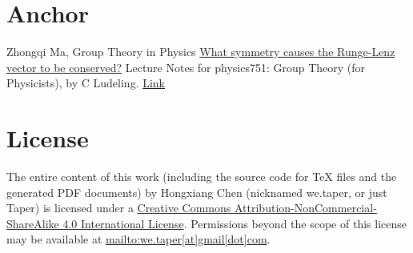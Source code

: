 \documentclass{article}
\numberwithin{equation}{subsection} %
\theoremstyle{definition}
\begin{document}
\section{Anchor}
\label{sec:Anchor}
\begin{thebibliography}{1}
     Zhongqi Ma, Group Theory in Physics
     \href{physics.stackexchange.com/questions/18088/what-symmetry-causes-the-runge-lenz-vector-to-be-conserved}{What symmetry causes the Runge-Lenz vector to be conserved?}
     Lecture Notes for physics751: Group Theory (for
    Physicists), by C Ludeling.
    \href{http://www.th.physik.uni-bonn.de/nilles/people/luedeling/grouptheory/data/grouptheorynotes.pdf}{Link}
\end{thebibliography}
\printnomenclature
\section{License}
The entire content of this work (including the source code
for TeX files and the generated PDF documents) by 
Hongxiang Chen (nicknamed we.taper, or just Taper) is
licensed under a 
\href{http://creativecommons.org/licenses/by-nc-sa/4.0/}{Creative 
Commons Attribution-NonCommercial-ShareAlike 4.0 International 
License}. Permissions beyond the scope of this 
license may be available at \url{mailto:we.taper[at]gmail[dot]com}.
\end{document}
